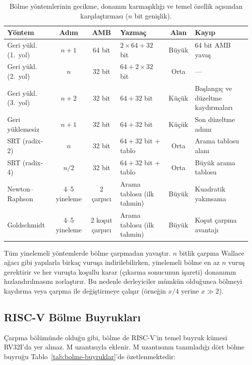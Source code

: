 \begin{table}[htbp]
\centering
\caption[Bölme yöntemlerinin karşılaştırması]{Bölme yöntemlerinin gecikme, donanım karmaşıklığı ve temel özellik açısından karşılaştırması ($n$ bit genişlik).}
\label{tab:bolme-yol-karsilastirma}
\footnotesize
\begin{tabularx}{\textwidth}{l c c l c X}
\toprule
\textbf{Yöntem} & \textbf{Adım} & \textbf{AMB} & \textbf{Yazmaç} & \textbf{Alan} & \textbf{Kayıp} \\
\midrule
Geri yükl. (1.\ yol) & $n{+}1$ & 64 bit & $2{\times}64 + 32$ bit & Büyük & 64 bit AMB yavaş \\
Geri yükl. (2.\ yol) & $n$ & 32 bit & $64 + 2{\times}32$ bit & Orta & --- \\
Geri yükl. (3.\ yol) & $n{+}2$ & 32 bit & $64 + 32$ bit & Küçük & Başlangıç ve düzeltme kaydırmaları \\
Geri yüklemesiz & $n{+}1$ & 32 bit & $64 + 32$ bit & Küçük & Son düzeltme adımı \\
SRT (radix-2) & $n$ & 32 bit & $64 + 32$ bit + tablo & Orta & Arama tablosu alanı \\
SRT (radix-4) & $n/2$ & 32 bit & $64 + 32$ bit + tablo & Orta & Büyük arama tablosu \\
\midrule
Newton--Raphson & 4--5 yineleme & 2 çarpıcı & Arama tablosu (ilk tahmin) & Büyük & Kuadratik yakınsama \\
Goldschmidt & 4--5 yineleme & 2 koşut çarpıcı & Arama tablosu (ilk tahmin) & Büyük & Koşut çarpma avantajı \\
\bottomrule
\end{tabularx}
\end{table}

Tüm yinelemeli yöntemlerde bölme çarpmadan yavaştır. $n$ bitlik çarpma Wallace ağacı gibi yapılarla birkaç vuruşa indirilebilirken, yinelemeli bölme en az $n$ vuruş gerektirir ve her vuruşta koşullu karar (çıkarma sonucunun işareti) donanımın hızlandırılmasını zorlaştırır. Bu nedenle derleyiciler mümkün olduğunca bölmeyi kaydırma veya çarpma ile değiştirmeye çalışır (örneğin $x / 4$ yerine $x \gg 2$).


\subsection{RISC-V Bölme Buyrukları}
\label{sec:riscv-bolme-buyruklar}

Çarpma bölümünde olduğu gibi, bölme de RISC-V'in temel buyruk kümesi RV32I'da yer almaz. M uzantısıyla eklenir. M uzantısının tanımladığı dört bölme buyruğu Tablo~\ref{tab:bolme-buyruklar}'de özetlenmektedir:


